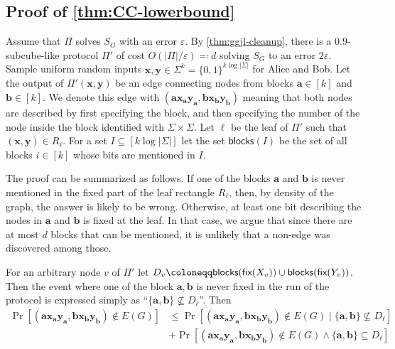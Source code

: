 \documentclass[10pt,a4paper]{article}
\theoremstyle{definition}
\theoremstyle{remark}
\theoremstyle{example}
\theoremstyle{plain}
\renewcommand{\epsilon}{\varepsilon}
\newcommand{\fix}{\textsf{\upshape fix}}
\newcommand{\xbf}{\bm{x}}
\newcommand{\ybf}{\bm{y}}
\newcommand{\protocolPi}{\Pi}
\newcommand{\protocolPiAlt}{\Pi'}
\begin{document}
\subsection{Proof of \autoref{thm:CC-lowerbound}}
\newcommand{\dng}{\textsf{blocks}}
Assume that $\protocolPi$ solves $S_{G}$ with an error $\epsilon$. By \autoref{thm:ggjl-cleanup}, there is a $0.9$-subcube-like protocol $\protocolPiAlt$ of cost $O(|\protocolPi| / \epsilon) \eqqcolon d$ solving 
$S_{G}$ to an error $2\varepsilon$. 
Sample uniform random inputs $\xbf, \ybf \in \Sigma^k = \{0,1\}^{k \log |\Sigma|}$ 
for Alice and Bob. Let the output of $\protocolPiAlt(\xbf,\ybf)$ be an edge connecting nodes from blocks $\bm a \in [k]$ and $\bm b \in [k]$. We denote this edge with $(\bm a \bm x_{\bm a} \bm y_{\bm a}, \bm b \bm x_{\bm b} \bm y_{\bm b})$ meaning that both nodes are described by first specifying the block, and then specifying the number of the node inside the block identified with $\Sigma \times \Sigma$.
Let $\bm \ell$ be the leaf of $\protocolPiAlt$ such that $(\bm x, \bm y) \in R_{\bm \ell}$.
 For a set $I \subseteq [k \log |\Sigma|]$ let the set $\dng(I)$ be the set of all blocks $i \in [k]$ whose bits are mentioned in $I$.

The proof can be summarized as follows. If one of the blocks $\bm a$ and $\bm b$ is never mentioned in the fixed part of the leaf rectangle $R_{\bm \ell}$, then, by density of the graph, the answer is likely to be wrong. Otherwise, at least one bit describing the nodes in $\bm a$ and $\bm b$ is fixed at the leaf. In that case, we argue that since there are at most $d$ blocks that can be mentioned, it is unlikely that a non-edge was discovered among those.

 For an arbitrary node $v$ of $\protocolPiAlt$ let $D_v \coloneqq \dng(\fix(X_v)) \cup \dng(\fix(Y_v))$. Then the event where one of the block $\bm a, \bm b$ is never fixed in the run of the protocol is expressed simply as ``$\{\bm a, \bm b\} \not\subseteq D_{\bm \ell}$''. Then
 \begin{align} \Pr[(\bm a \bm x_{\bm a} \bm y_{\bm a}, \bm b \bm x_{\bm b} \bm y_{\bm b}) \not\in E(G)] &\le \Pr[(\bm a \bm x_{\bm a} \bm y_{\bm a}, \bm b \bm x_{\bm b} \bm y_{\bm b}) \not\in E(G) \mid \{\bm a, \bm b\} \not\subseteq D_{\bm \ell}] \label{l:first-summand}\\
 &+ \Pr[(\bm a \bm x_{\bm a} \bm y_{\bm a}, \bm b \bm x_{\bm b} \bm y_{\bm b}) \not\in E(G) \land \{\bm a, \bm b\} \subseteq D_{\bm \ell}] \label{l:second-summand}
 \end{align}
\end{document}

